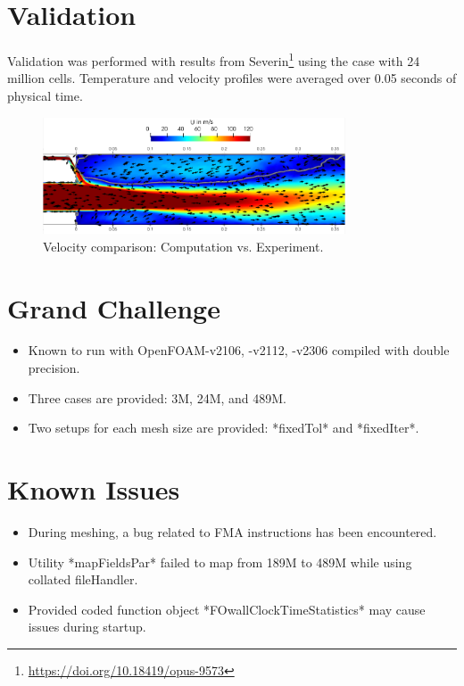 \section*{Validation}
Validation was performed with results from Severin\footnote{\url{https://doi.org/10.18419/opus-9573}} using the case with 24 million cells. Temperature and velocity profiles were averaged over 0.05 seconds of physical time.

\begin{figure}[h]
    \centering
    \includegraphics[width=0.8\textwidth]{figs/DLRCJH/7608d6e2c381894c3303bca616371060.png}
    \caption{Velocity comparison: Computation vs. Experiment.}
\end{figure}

\section*{Grand Challenge}
\begin{itemize}
    \item Known to run with OpenFOAM-v2106, -v2112, -v2306 compiled with double precision.
    \item Three cases are provided: 3M, 24M, and 489M.
    \item Two setups for each mesh size are provided: *fixedTol* and *fixedIter*.
\end{itemize}

\section*{Known Issues}
\begin{itemize}
    \item During meshing, a bug related to FMA instructions has been encountered.
    \item Utility *mapFieldsPar* failed to map from 189M to 489M while using collated fileHandler.
    \item Provided coded function object *FOwallClockTimeStatistics* may cause issues during startup.
\end{itemize}

